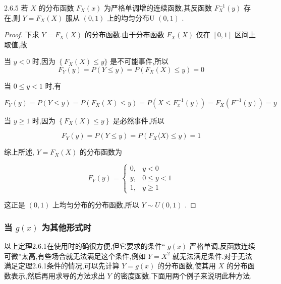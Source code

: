 \begin{theorem}{}{2.6.5}
	若 $ X $ 的分布函数 $ F_{X}(x) $ 为严格单调增的连续函数,其反函数 $ F_{X}^{-1}(y) $ 存在,则 $ Y=F_{X}(X) $ 服从 $ (0,1) $ 上的均匀分布U $ (0,1) $ .
\end{theorem}

\begin{proof}
	下求 $ Y=F_{X}(X) $ 的分布函数.由于分布函数 $ F_{X}(X) $ 仅在 $ [0,1] $ 区间上取值,故
	
	当 $ y<0 $ 时,因为 $ \left\{F_{X}(X) \leqslant y\right.\} $ 是不可能事件,所以 
	\[
	F_{Y}(y)=P(Y \leqslant y)=P\left(F_{X}(X) \leqslant y\right)=0
	\]
	
	当 $ 0 \leqslant y<1 $ 时,有
	
	\[
	F_{Y}(y)=P(Y \leqslant y)=P\left(F_{X}(X) \leqslant y\right)=P\left(X \leqslant F_{x}^{-1}(y)\right)=F_{X}\left(F^{-1}(y)\right)=y
	\]
	
	当 $ y \geqslant 1 $ 时,因为 $ \left\{F_{X}(X) \leqslant y\right\} $ 是必然事件,所以
	
	\[
	F_{Y}(y)=P(Y \leqslant y)=P\left(F_{X}\langle X) \leqslant y\right)=1
	\]
	
	综上所述, $ Y=F_{X}(X) $ 的分布函数为
	
	\[
	F_{Y}(y)=\left\{\begin{array}{ll}{0,} & {y<0} \\ {y,} & {0 \leqslant y<1} \\ {1,} & {y \geqslant 1}\end{array}\right.
	\]
	
	这正是 $ (0,1) $ 上均匀分布的分布函数,所以 $ Y \sim U(0,1) $ .
\end{proof}

\subsubsection{当 $ g(x) $ 为其他形式时}

以上定理2.6.1在使用时的确很方便,但它要求的条件“ $ g(x) $ 严格单调,反函数连续可微”太高,有些场合就无法满足这个条件,例如 $ Y=X^{2} $ 就无法满足条件.对于无法满足定理2.6.1条件的情况,可以先计算 $ Y=g(x) $ 的分布函数,使其用 $ X $ 的分布函数表示,然后再用求导的方法求出 $ Y $ 的密度函数.下面用两个例子来说明此种方法.

